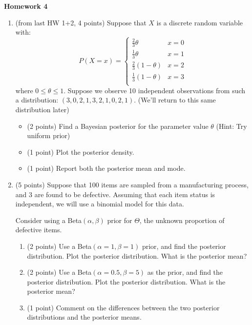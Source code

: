 \documentclass[10pt,twoside]{article}\usepackage[]{graphicx}\usepackage[dvipsnames,svgnames,table]{xcolor}
\begin{document}
\begin{flushright}
\begin{minipage}{.33\textwidth}
\rightline{\today}
\end{minipage}
\end{flushright}

\begin{center}
{\large{\textbf{Homework 4}}}
\end{center}

\begin{enumerate}

    \item (from last HW 1+2, 4 points) Suppose that $X$ is a discrete random variable with:
    $$
    P(X = x) = \begin{cases} \frac{2}{3}\theta & x = 0 \\ \frac{1}{3}\theta & x = 1 \\ \frac{2}{3}(1 - \theta) & x = 2 \\ \frac{1}{3}(1 - \theta) & x = 3 \\\end{cases}
    $$
    where $0 \leq \theta \leq 1$. Suppose we observe 10 independent observations from such a distribution: $(3, 0, 2, 1, 3, 2, 1, 0, 2, 1)$.
    (We'll return to this same distribution later)
    \begin{itemize}
      \item (2 points) Find a Bayesian posterior for the parameter value $\theta$ (Hint: Try uniform prior)
      \item (1 point) Plot the posterior density.
      \item (1 point) Report both the posterior mean and mode.
    \end{itemize}
    
    \item (5 points) Suppose that 100 items are sampled from a manufacturing process, and 3 are found to be defective.
    Assuming that each item status is independent, we will use a binomial model for this data.
    
    Consider using a Beta$(\alpha, \beta)$ prior for $\Theta$, the unknown proportion of defective items.
    
    \begin{enumerate}
      \item (2 points) Use a Beta$(\alpha = 1, \beta = 1)$ prior, and find the posterior distribution. Plot the posterior distribution. What is the posterior mean? 
      \item (2 points) Use a Beta$(\alpha = 0.5, \beta = 5)$ as the prior, and find the posterior distribution. Plot the posterior distribution. What is the posterior mean?
      \item (1 point) Comment on the differences between the two posterior distributions and the posterior means.
    \end{enumerate}


\end{enumerate}
\end{document}
